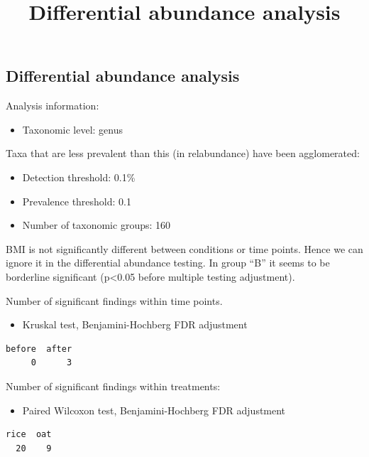\documentclass[
]{article}
\title{Differential abundance analysis}
\author{}
\date{}
\providecommand{\tightlist}{%
  \setlength{\itemsep}{0pt}\setlength{\parskip}{0pt}}\usepackage{longtable,booktabs,array}
\begin{document}
\maketitle


\subsection{Differential abundance
analysis}\label{differential-abundance-analysis}

Analysis information:

\begin{itemize}
\tightlist
\item
  Taxonomic level: genus
\end{itemize}

Taxa that are less prevalent than this (in relabundance) have been
agglomerated:

\begin{itemize}
\tightlist
\item
  Detection threshold: 0.1\%
\item
  Prevalence threshold: 0.1
\item
  Number of taxonomic groups: 160
\end{itemize}

BMI is not significantly different between conditions or time points.
Hence we can ignore it in the differential abundance testing. In group
``B'' it seems to be borderline significant (p\textless0.05 before
multiple testing adjustment).

Number of significant findings within time points.

\begin{itemize}
\tightlist
\item
  Kruskal test, Benjamini-Hochberg FDR adjustment
\end{itemize}

\begin{verbatim}
before  after 
     0      3 
\end{verbatim}

Number of significant findings within treatments:

\begin{itemize}
\tightlist
\item
  Paired Wilcoxon test, Benjamini-Hochberg FDR adjustment
\end{itemize}

\begin{verbatim}
rice  oat 
  20    9 
\end{verbatim}
\end{document}
